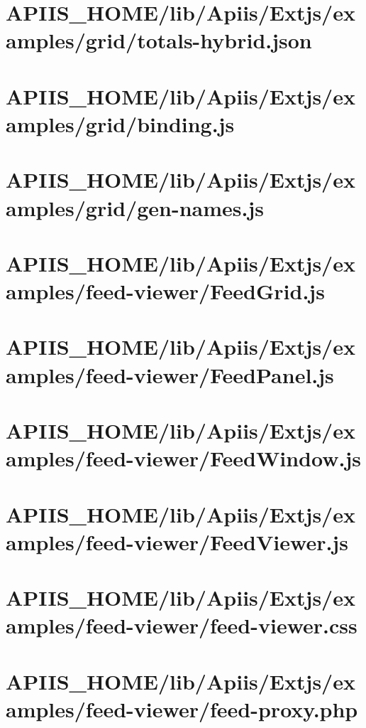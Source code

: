 \section{APIIS\_HOME/lib/Apiis/Extjs/examples/grid/totals-hybrid.json} 
\section{APIIS\_HOME/lib/Apiis/Extjs/examples/grid/binding.js} 
\section{APIIS\_HOME/lib/Apiis/Extjs/examples/grid/gen-names.js} 
\section{APIIS\_HOME/lib/Apiis/Extjs/examples/feed-viewer/FeedGrid.js} 
\section{APIIS\_HOME/lib/Apiis/Extjs/examples/feed-viewer/FeedPanel.js} 
\section{APIIS\_HOME/lib/Apiis/Extjs/examples/feed-viewer/FeedWindow.js} 
\section{APIIS\_HOME/lib/Apiis/Extjs/examples/feed-viewer/FeedViewer.js} 
\section{APIIS\_HOME/lib/Apiis/Extjs/examples/feed-viewer/feed-viewer.css} 
\section{APIIS\_HOME/lib/Apiis/Extjs/examples/feed-viewer/feed-proxy.php} 
